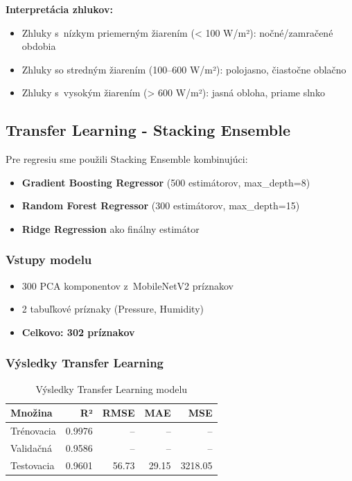 \documentclass[a4paper, 12pt]{article}
\begin{document}
\textbf{Interpretácia zhlukov:}
\begin{itemize}
    \item Zhluky s~nízkym priemerným žiarením (< 100 W/m²): nočné/zamračené obdobia
    \item Zhluky so stredným žiarením (100--600 W/m²): polojasno, čiastočne oblačno
    \item Zhluky s~vysokým žiarením (> 600 W/m²): jasná obloha, priame slnko
\end{itemize}

\clearpage

\subsection{Transfer Learning - Stacking Ensemble}

Pre regresiu sme použili Stacking Ensemble kombinujúci:
\begin{itemize}
    \item \textbf{Gradient Boosting Regressor} (500 estimátorov, max\_depth=8)
    \item \textbf{Random Forest Regressor} (300 estimátorov, max\_depth=15)
    \item \textbf{Ridge Regression} ako finálny estimátor
\end{itemize}

\subsubsection{Vstupy modelu}

\begin{itemize}
    \item 300 PCA komponentov z~MobileNetV2 príznakov
    \item 2 tabuľkové príznaky (Pressure, Humidity)
    \item \textbf{Celkovo: 302 príznakov}
\end{itemize}

\subsubsection{Výsledky Transfer Learning}

\begin{table}[H]
\centering
\begin{tabular}{lrrrr}
\toprule
\textbf{Množina} & \textbf{R²} & \textbf{RMSE} & \textbf{MAE} & \textbf{MSE} \\
\midrule
Trénovacia & 0.9976 & -- & -- & -- \\
Validačná & 0.9586 & -- & -- & -- \\
Testovacia & 0.9601 & 56.73 & 29.15 & 3218.05 \\
\bottomrule
\end{tabular}
\caption{Výsledky Transfer Learning modelu}
\end{table}
\end{document}
